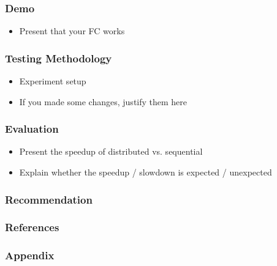 \documentclass[11pt,t,usepdftitle=false,aspectratio=169]{beamer}
\begin{document}
\begin{frame}
\frametitle{Demo}
    \begin{itemize}
        \item Present that your FC works
    \end{itemize}
\end{frame}

\begin{frame}
\frametitle{Testing Methodology}
    \begin{itemize}
        \item Experiment setup
        \item If you made some changes, justify them here
    \end{itemize}
\end{frame}

\begin{frame}
\frametitle{Evaluation}
    \begin{itemize}
        \item Present the speedup of distributed vs. sequential
        \item Explain whether the speedup / slowdown is expected / unexpected
    \end{itemize}
\end{frame}

\begin{frame}
\frametitle{Recommendation}
\end{frame}




\begingroup

{\footnotesize
\begin{frame}
  \frametitle{References}
  \begin{minipage}[t]{1\textwidth}
    \vspace{1cm}
  \end{minipage}
\end{frame}
}

\begin{frame}
    \frametitle{Appendix}

\end{frame}
\endgroup
\end{document}
